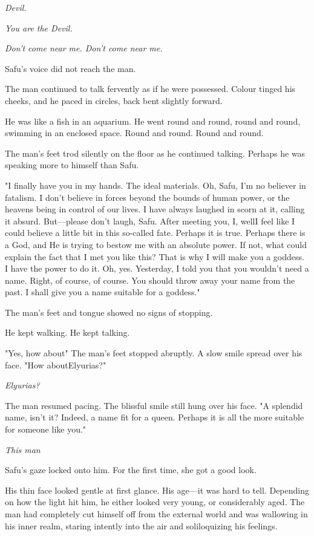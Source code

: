 \emph{Devil.}

\emph{You are the Devil.}

\emph{Don't come near me. Don't come near me.}

Safu's voice did not reach the man.

The man continued to talk fervently as if he were possessed. Colour
tinged his cheeks, and he paced in circles, back bent slightly forward.

He was like a fish in an aquarium. He went round and round, round and
round, swimming in an enclosed space. Round and round. Round and round.

The man's feet trod silently on the floor as he continued talking.
Perhaps he was speaking more to himself than Safu.

"I finally have you in my hands. The ideal materials. Oh, Safu, I'm no
believer in fatalism. I don't believe in forces beyond the bounds of
human power, or the heavens being in control of our lives. I have always
laughed in scorn at it, calling it absurd. But---please don't laugh, Safu.
After meeting you, I, well\el I feel like I could believe a little bit
in this so-called fate. Perhaps it is true. Perhaps there is a God, and
He is trying to bestow me with an absolute power. If not, what could
explain the fact that I met you like this? That is why I will make you a
goddess. I have the power to do it. Oh, yes. Yesterday, I told you that
you wouldn't need a name. Right, of course, of course. You should throw
away your name from the past. I shall give you a name suitable for a
goddess."

The man's feet and tongue showed no signs of stopping.

He kept walking. He kept talking.

"Yes, how about\el " The man's feet stopped abruptly. A slow smile spread
over his face. "How about\el Elyurias?"

\emph{Elyurias?}

The man resumed pacing. The blissful smile still hung over his face. "A
splendid name, isn't it? Indeed, a name fit for a queen. Perhaps it is
all the more suitable for someone like you."

\emph{This man\el }

Safu's gaze locked onto him. For the first time, she got a good look.

His thin face looked gentle at first glance. His age---it was hard to
tell. Depending on how the light hit him, he either looked very young,
or considerably aged. The man had completely cut himself off from the
external world and was wallowing in his inner realm, staring intently
into the air and soliloquizing his feelings.

